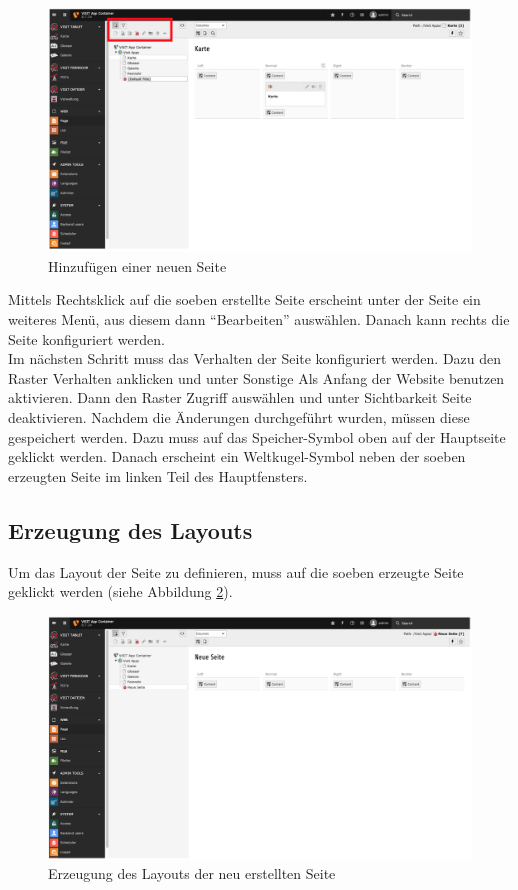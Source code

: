 \begin{figure}[ht!]
\centering
\includegraphics[width=12cm]{Figures/paula/typo3/neue_seite_hinzufuegen.png}
\caption{Hinzufügen einer neuen Seite}
\label{img:neue_seite_hinzufuegen}
\end{figure}

Mittels Rechtsklick auf die soeben erstellte Seite erscheint unter der Seite ein weiteres Menü, aus diesem dann “Bearbeiten” auswählen. Danach kann rechts die Seite konfiguriert werden.\\
Im nächsten Schritt muss das Verhalten der Seite konfiguriert werden. Dazu den Raster \glqq Verhalten\grqq{} anklicken und unter \glqq Sonstige\grqq{} \glqq Als Anfang der Website benutzen\grqq{} aktivieren.
Dann den Raster \glqq Zugriff\grqq{} auswählen und unter \glqq Sichtbarkeit\grqq{} \glqq Seite\grqq{} deaktivieren.
Nachdem die Änderungen durchgeführt wurden, müssen diese gespeichert werden. Dazu muss auf das Speicher-Symbol oben auf der Hauptseite geklickt werden. Danach erscheint ein Weltkugel-Symbol neben der soeben erzeugten Seite im linken Teil des Hauptfensters.

\subsection{Erzeugung des Layouts}

Um das Layout der Seite zu definieren, muss auf die soeben erzeugte Seite geklickt werden (siehe Abbildung \ref{img:layout_erzeugung}).

\begin{figure}[ht!]
\centering
\includegraphics[width=12cm]{Figures/paula/typo3/layout_erzeugung.png}
\caption{Erzeugung des Layouts der neu erstellten Seite}
\label{img:layout_erzeugung}
\end{figure}

